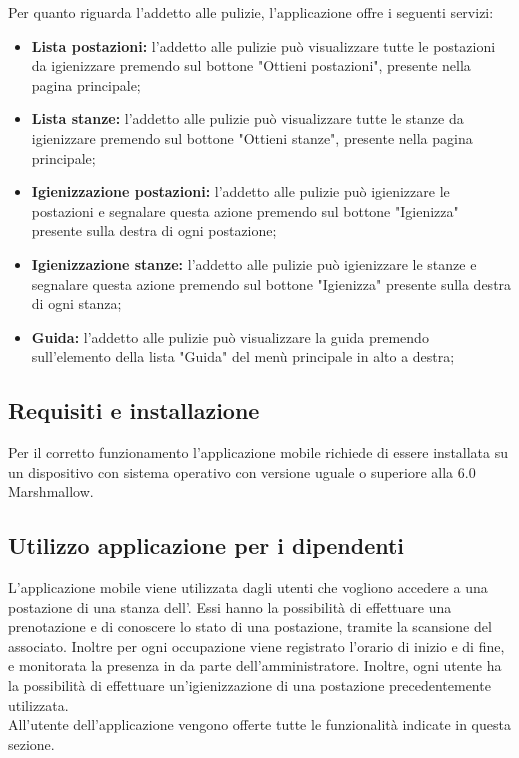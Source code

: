Per quanto riguarda l'addetto alle pulizie, l'applicazione offre i seguenti servizi:
\begin{itemize}
	\item \textbf{Lista postazioni:} l'addetto alle pulizie può visualizzare tutte le postazioni da igienizzare premendo sul bottone "Ottieni postazioni", presente nella pagina principale; \\
	\item \textbf{Lista stanze:} l'addetto alle pulizie può visualizzare tutte le stanze da igienizzare premendo sul bottone "Ottieni stanze", presente nella pagina principale; \\
	\item \textbf{Igienizzazione postazioni:} l'addetto alle pulizie può igienizzare le postazioni e segnalare questa azione premendo sul bottone "Igienizza" presente sulla destra di ogni postazione;
	\item \textbf{Igienizzazione stanze:} l'addetto alle pulizie può igienizzare le stanze e segnalare questa azione premendo sul bottone "Igienizza" presente sulla destra di ogni stanza;
	\item \textbf{Guida:} l'addetto alle pulizie può visualizzare la guida premendo sull’elemento della lista "Guida" del menù principale in alto a destra; \\
	
\end{itemize}

\subsection{Requisiti e installazione}
	Per il corretto funzionamento l'applicazione mobile richiede di essere installata su un dispositivo con sistema operativo  con versione uguale o superiore alla 6.0 Marshmallow.
	
	\subsection{Utilizzo applicazione per i dipendenti}
	L'applicazione mobile viene utilizzata dagli utenti che vogliono accedere a una postazione di una stanza dell'. Essi hanno la possibilità di effettuare una prenotazione e di conoscere lo stato di una postazione, tramite la scansione del  associato. Inoltre per ogni occupazione viene registrato l'orario di inizio e di fine, e monitorata la presenza in  da parte dell'amministratore. Inoltre, ogni utente ha la possibilità di effettuare un'igienizzazione di una postazione precedentemente utilizzata. 
	\\All'utente dell'applicazione vengono offerte tutte le funzionalità indicate in questa sezione.
